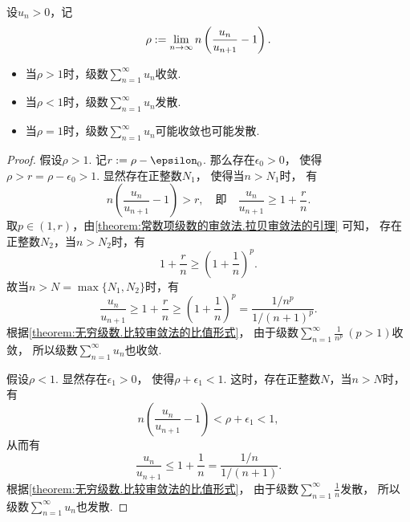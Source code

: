 \begin{theorem}[拉贝审敛法]
设\(u_n > 0\)，记\[
	\rho := \lim_{n\to\infty} n \left(\frac{u_n}{u_{n+1}} - 1\right).
\]
\begin{itemize}
	\item 当\(\rho>1\)时，级数\(\sum_{n=1}^\infty u_n\)收敛.
	\item 当\(\rho<1\)时，级数\(\sum_{n=1}^\infty u_n\)发散.
	\item 当\(\rho=1\)时，级数\(\sum_{n=1}^\infty u_n\)可能收敛也可能发散.
\end{itemize}
\begin{proof}
假设\(\rho>1\).
记\(r \defeq \rho-\epsilon_0\).
那么存在\(\epsilon_0>0\)，
使得\(\rho>r=\rho-\epsilon_0>1\).
显然存在正整数\(N_1\)，
使得当\(n>N_1\)时，
有\[
	n \left(\frac{u_n}{u_{n+1}}-1\right) > r,
	\quad\text{即}\quad
	\frac{u_n}{u_{n+1}} \geq 1+\frac{r}{n}.
\]
取\(p\in(1,r)\)，由\cref{theorem:常数项级数的审敛法.拉贝审敛法的引理} 可知，
存在正整数\(N_2\)，当\(n>N_2\)时，有\[
	1+\frac{r}{n} \geq \left(1+\frac1n\right)^p.
\]
故当\(n>N=\max\{N_1,N_2\}\)时，有\[
	\frac{u_n}{u_{n+1}}
	\geq 1+\frac{r}{n}
	\geq \left(1+\frac1n\right)^p
	= \frac{1/n^p}{1/(n+1)^p}.
\]
根据\cref{theorem:无穷级数.比较审敛法的比值形式}，
由于级数\(\sum_{n=1}^\infty \frac1{n^p}\ (p>1)\)收敛，
所以级数\(\sum_{n=1}^\infty u_n\)也收敛.

假设\(\rho<1\).
显然存在\(\epsilon_1>0\)，
使得\(\rho+\epsilon_1<1\).
这时，存在正整数\(N\)，当\(n>N\)时，有\[
	n \left(\frac{u_n}{u_{n+1}}-1\right)
	< \rho+\epsilon_1
	< 1,
\]
从而有\[
	\frac{u_n}{u_{n+1}}
	\leq 1+\frac1n
	= \frac{1/n}{1/(n+1)}.
\]
根据\cref{theorem:无穷级数.比较审敛法的比值形式}，
由于级数\(\sum_{n=1}^\infty \frac1n\)发散，
所以级数\(\sum_{n=1}^\infty u_n\)也发散.
\end{proof}
\end{theorem}

